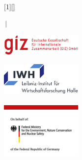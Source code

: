 \renewcommand{\inserttitlegraphic}{
\parbox[b][2cm][t]{4cm}{\includegraphics[width = 4cm, keepaspectratio]{pictures/GIZ_Logo.png}}  \hspace{0.1cm} \parbox[b][2cm][t]{4cm}{\includegraphics[width = 4cm, keepaspectratio]{pictures/IWH_Logo_RGB_DE_Grossformat.png}} \hfill \parbox[b][2cm][t]{3.21cm}{\includegraphics[keepaspectratio,width=4.00cm]{pictures/seperationbar.png} \\ \includegraphics[width = 4cm, keepaspectratio]{pictures/BMWI_logo.png}}
}
[1][]
{	
	\vspace{2.75cm}
  \begin{center}\textbf{\inserttitle}\end{center}\par
  \begin{center}\insertsubtitle\end{center}\par
  \insertauthor $\, \vert$ \insertdate \par
  \insertinstitute\par
	\vspace{0.25cm}
  \inserttitlegraphic
}



\linespread{1.2}




